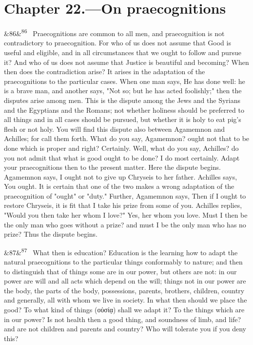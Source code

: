 \documentclass[12pt]{article}
\newcommand{\para}[1][]{\par\noindent\ifx&#1&\else\textsuperscript{\footnotesize #1}~\fi}
\begin{document}
\section*{Chapter 22.---On praecognitions}

\para[86] Praecognitions are common to all men, and praecognition is not contradictory to praecognition. For who of us does not assume that Good is useful and eligible, and in all circumstances that we ought to follow and pursue it? And who of us does not assume that Justice is beautiful and becoming? When then does the contradiction arise? It arises in the adaptation of the praecognitions to the particular cases. When one man says, He has done well: he is a brave man, and another says, "Not so; but he has acted foolishly;" then the disputes arise among men. This is the dispute among the Jews and the Syrians and the Egyptians and the Romans; not whether holiness should be preferred to all things and in all cases should be pursued, but whether it is holy to eat pig's flesh or not holy. You will find this dispute also between Agamemnon and Achilles; for call them forth. What do you say, Agamemnon? ought not that to be done which is proper and right? Certainly. Well, what do you say, Achilles? do you not admit that what is good ought to be done? I do most certainly. Adapt your praecognitions then to the present matter. Here the dispute begins. Agamemnon says, I ought not to give up Chryseis to her father. Achilles says, You ought. It is certain that one of the two makes a wrong adaptation of the praecognition of "ought" or "duty." Further, Agamemnon says, Then if I ought to restore Chryseis, it is fit that I take his prize from some of you. Achilles replies, "Would you then take her whom I love?" Yes, her whom you love. Must I then be the only man who goes without a prize? and must I be the only man who has no prize? Thus the dispute begins.

\para[87] What then is education? Education is the learning how to adapt the natural praecognitions to the particular things conformably to nature; and then to distinguish that of things some are in our power, but others are not: in our power are will and all acts which depend on the will; things not in our power are the body, the parts of the body, possessions, parents, brothers, children, country and generally, all with whom we live in society. In what then should we place the good? To what kind of things (οὐσίᾳ) shall we adapt it? To the things which are in our power? Is not health then a good thing, and soundness of limb, and life? and are not children and parents and country? Who will tolerate you if you deny this?
\end{document}
